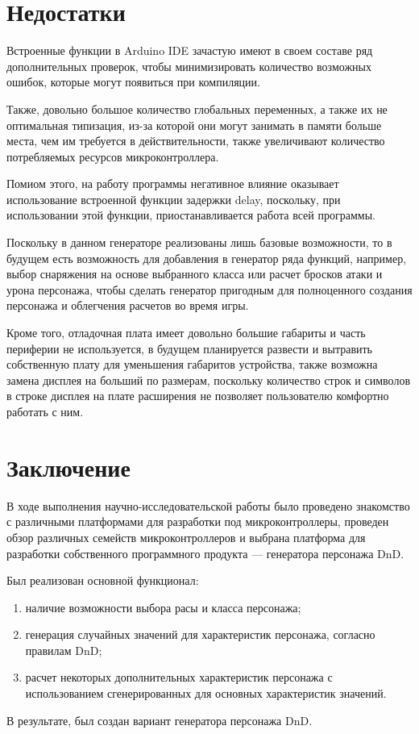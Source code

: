 \documentclass[12pt,a4paper]{article}
\begin{document}
\section{Недостатки}

Встроенные функции в Arduino IDE зачастую имеют в своем составе ряд дополнительных проверок, чтобы минимизировать количество возможных ошибок, которые могут появиться при компиляции.
    
Также, довольно большое количество глобальных переменных, а также их не оптимальная типизация, из-за которой они могут занимать в памяти больше места, чем им требуется в действительности, также увеличивают количество потребляемых ресурсов микроконтроллера.

Помиом этого, на работу программы негативное влияние оказывает использование встроенной функции задержки delay, поскольку, при использовании этой функции, приостанавливается работа всей программы.

Поскольку в данном генераторе реализованы лишь базовые возможности, то в будущем есть возможность для добавления в генератор ряда функций, например, выбор снаряжения на основе выбранного класса или расчет бросков атаки и урона персонажа, чтобы сделать генератор пригодным для полноценного создания персонажа и облегчения расчетов во время игры.

Кроме того, отладочная плата имеет довольно большие габариты и часть периферии не используется, в будущем планируется развести и вытравить собственную плату для уменьшения габаритов устройства, также возможна замена дисплея на больший по размерам, поскольку количество строк и символов в строке дисплея на плате расширения не позволяет пользователю комфортно работать с ним.

\section{Заключение}

В ходе выполнения научно-исследовательской работы было проведено знакомство с различными платформами для разработки под микроконтроллеры, проведен обзор различных семейств микроконтроллеров и выбрана платформа для разработки собственного программного продукта --- генератора персонажа DnD.
    
Был реализован основной функционал:

\begin{enumerate}
    \item наличие возможности выбора расы и класса персонажа;
    
    \item генерация случайных значений для характеристик персонажа, согласно правилам DnD;
    
    \item расчет некоторых дополнительных характеристик персонажа с использованием сгенерированных для основных характеристик значений.
\end{enumerate}

В результате, был создан вариант генератора персонажа DnD.
\end{document}
